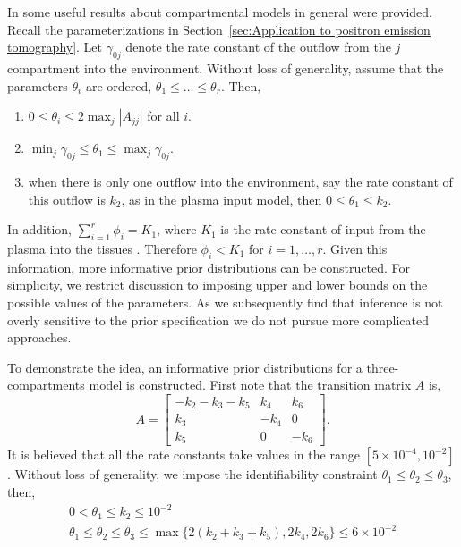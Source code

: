 In \cite{Anderson:1983wk} some useful results about compartmental models in
general were provided. Recall the parameterizations in
Section~\ref{sec:Application to positron emission tomography}. Let
$\gamma_{0j}$ denote the rate constant of the outflow from the $j$\xth
compartment into the environment.  Without loss of generality, assume that the
parameters $\theta_i$ are ordered, $\theta_1 \le \dots \le \theta_r$. Then,
\begin{enumerate}
  \item $0 \le \theta_i \le 2\max_j|A_{jj}|$ for all $i$.
  \item $\min_j\gamma_{0j} \le \theta_1 \le \max_j\gamma_{0j}$.
  \item when there is only one outflow into the environment, say the rate
    constant of this outflow is $k_2$, as in the plasma input model, then $0
    \le \theta_1 \le k_2$.
\end{enumerate}
In addition, $\sum_{i=1}^r \phi_i = K_1$, where $K_1$ is the rate constant of
input from the plasma into the tissues \cite{Gunn:2001cx}. Therefore $\phi_i <
K_1$ for $i = 1, \dots, r$. Given this information, more informative prior
distributions can be constructed. For simplicity, we restrict discussion to
imposing upper and lower bounds on the possible values of the parameters. As
we subsequently find that inference is not overly sensitive to the prior
specification we do not pursue more complicated approaches.

To demonstrate the idea, an informative prior distributions for a
three-compartments model is constructed. First note that the transition matrix
$A$ is,
\begin{equation*}
  A = \begin{bmatrix}
    - k_2 - k_3 - k_5 & k_4  & k_6 \\
    k_3               & -k_4 & 0   \\
    k_5               & 0    & -k_6
  \end{bmatrix}.
\end{equation*}
It is believed that all the rate constants take values in the range $[5
\times 10^{-4}, 10^{-2}]$. Without loss of generality, we impose the
identifiability constraint $\theta_1 \leq \theta_2 \leq \theta_3$, then,
\begin{gather}
  0 < \theta_1 \le k_2 \le 10^{-2} \\
  \theta_1 \leq \theta_2 \leq \theta_3 \leq \max\{2(k_2 + k_3 + k_5), 2k_4,
  2k_6\} \le 6 \times 10^{-2}
\end{gather}

